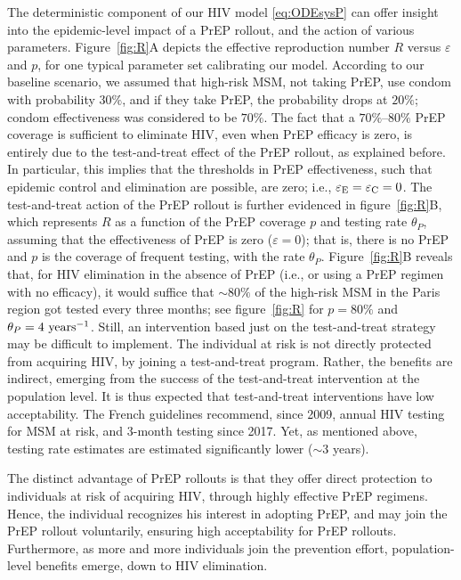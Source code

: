 \documentclass[12pt]{article}
\begin{document}
The deterministic component of our HIV model \eqref{eq:ODEsysP} can offer insight into the epidemic-level impact of a PrEP rollout, and the action of various parameters. Figure~\ref{fig:R}A depicts the effective reproduction number $R$ versus $\varepsilon$ and $p$, for one typical parameter set calibrating our model.  According to our baseline scenario, we assumed that high-risk MSM, not taking PrEP, use condom with probability $30\%$, and if they take PrEP, the probability drops at $20\%$; condom effectiveness was considered to be $70\%$. The fact that a $70\%$--$80\%$ PrEP coverage is sufficient to eliminate HIV, even when PrEP efficacy is zero, is entirely due to the test-and-treat effect of the PrEP rollout, as explained before. In particular, this implies that the thresholds in PrEP effectiveness, such that epidemic control and elimination are possible, are zero; i.e., $\varepsilon_{\rm E} = \varepsilon_{\rm C} = 0$. The test-and-treat action of the PrEP rollout is further evidenced in figure~\ref{fig:R}B, which represents $R$ as a function of the PrEP coverage $p$ and testing rate $\theta_P$, assuming that the effectiveness of PrEP is zero ($\varepsilon=0$); that is, there is no PrEP and $p$ is the coverage of frequent testing, with the rate $\theta_P$. Figure~\ref{fig:R}B reveals that, for HIV elimination in the absence of PrEP (i.e., or using a PrEP regimen with no efficacy), it would suffice that $\sim 80\%$ of the high-risk MSM in the Paris region got tested every three months; see figure~\ref{fig:R} for $p=80\%$ and $\theta_P=4~\rm{years^{-1}}$. Still, an intervention based just on the test-and-treat strategy may be difficult to implement. The individual at risk is not directly protected from acquiring HIV, by joining a test-and-treat program. Rather, the benefits are indirect, emerging from the success of the test-and-treat intervention at the population level. It is thus expected that test-and-treat interventions have low acceptability. The French guidelines recommend, since 2009, annual HIV testing for MSM at risk, and 3-month testing since 2017. {Yet, as mentioned above, testing rate estimates are estimated significantly lower ($\sim3$ years).}

The distinct advantage of PrEP rollouts is that they offer direct protection to individuals at risk of acquiring HIV, through highly effective PrEP regimens. Hence, the individual recognizes his interest in adopting PrEP, and may join the PrEP rollout voluntarily, ensuring high acceptability for PrEP rollouts. Furthermore, as more and more individuals join the prevention effort, population-level benefits emerge, down to HIV elimination.
\end{document}
